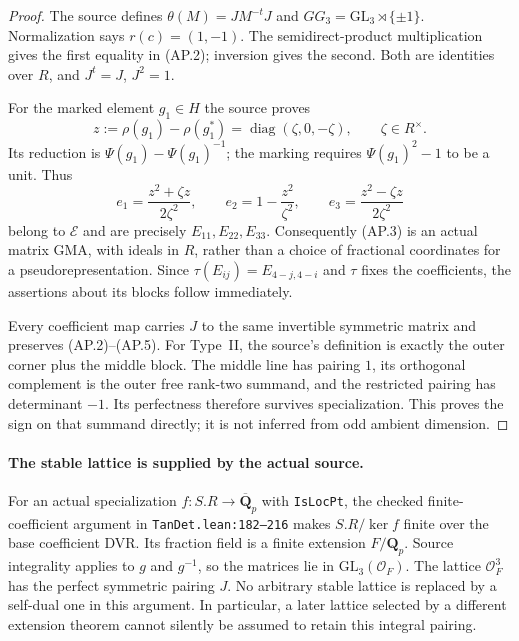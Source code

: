 \begin{proof}
The source defines $\theta(M)=JM^{-t}J$ and
$GG_3=\mathrm{GL}_3\rtimes\{\pm1\}$.  Normalization says
$r(c)=(1,-1)$.  The semidirect-product multiplication gives
the first equality in (AP.2); inversion gives the second.
Both are identities over $R$, and $J^t=J$, $J^2=1$.

For the marked element $g_1\in H$ the source proves
\[
 z:=\rho(g_1)-\rho(g_1^*)
       =\operatorname{diag}(\zeta,0,-\zeta),\qquad
 \zeta\in R^\times.                                        \tag{AP.4}
\]
Its reduction is $\Psi(g_1)-\Psi(g_1)^{-1}$; the marking
requires $\Psi(g_1)^2-1$ to be a unit.  Thus
\[
 e_1=\frac{z^2+\zeta z}{2\zeta^2},\qquad
 e_2=1-\frac{z^2}{\zeta^2},\qquad
 e_3=\frac{z^2-\zeta z}{2\zeta^2}                            \tag{AP.5}
\]
belong to $\mathcal E$ and are precisely $E_{11},E_{22},E_{33}$.
Consequently (AP.3) is an actual matrix GMA, with ideals in
$R$, rather than a choice of fractional coordinates for a
pseudorepresentation.  Since
$\tau(E_{ij})=E_{4-j,4-i}$ and $\tau$ fixes the coefficients,
the assertions about its blocks follow immediately.

Every coefficient map carries $J$ to the same invertible
symmetric matrix and preserves (AP.2)--(AP.5).  For Type~II,
the source's definition is exactly the outer corner plus the
middle block.  The middle line has pairing $1$, its orthogonal
complement is the outer free rank-two summand, and the
restricted pairing has determinant $-1$.  Its perfectness
therefore survives specialization.  This proves the sign on
that summand directly; it is not inferred from odd ambient
dimension.
\end{proof}

\paragraph{The stable lattice is supplied by the actual source.}
For an actual specialization $f:S.R\to\overline{\mathbf Q}_p$
with \texttt{IsLocPt}, the checked finite-coefficient argument
in \texttt{TanDet.lean:182--216} makes $S.R/\ker f$ finite
over the base coefficient DVR.  Its fraction field is a
finite extension $F/\mathbf Q_p$.  Source integrality applies
to $g$ and $g^{-1}$, so the matrices lie in
$\mathrm{GL}_3(\mathcal O_F)$.  The lattice
$\mathcal O_F^3$ has the perfect symmetric pairing $J$.
No arbitrary stable lattice is replaced by a self-dual one
in this argument.  In particular, a later lattice selected
by a different extension theorem cannot silently be assumed
to retain this integral pairing.

